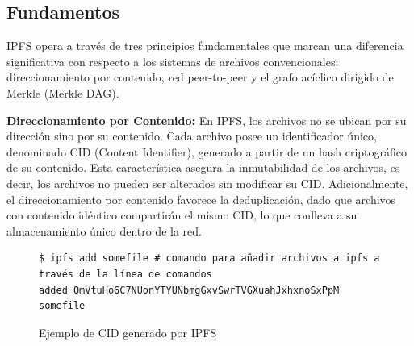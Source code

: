 \subsection{Fundamentos}\label{sect:fundamentos}
IPFS opera a través de tres principios fundamentales que marcan una diferencia significativa con respecto a los sistemas de archivos convencionales: direccionamiento por contenido, red peer-to-peer y el grafo acíclico dirigido de Merkle (Merkle DAG).


\textbf{Direccionamiento por Contenido:} En IPFS, los archivos no se ubican por su dirección sino por su contenido. Cada archivo posee un
identificador único, denominado CID (Content Identifier), generado a partir de un hash criptográfico de su contenido. Esta característica
asegura la inmutabilidad de los archivos, es decir, los archivos no pueden ser alterados sin modificar su CID. Adicionalmente, el
direccionamiento por contenido favorece la deduplicación, dado que archivos con contenido idéntico compartirán el mismo CID, lo que conlleva a
su almacenamiento único dentro de la red.

\begin{figure}[H]
      \begin{verbatim}
$ ipfs add somefile # comando para añadir archivos a ipfs a través de la línea de comandos
added QmVtuHo6C7NUonYTYUNbmgGxvSwrTVGXuahJxhxnoSxPpM somefile
      \end{verbatim}
      \caption{Ejemplo de CID generado por IPFS}
      \label{fig:ipfs-add}
\end{figure}

